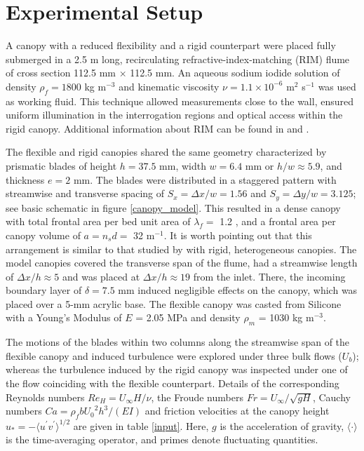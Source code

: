 \documentclass[lineno,authoryear]{FLO_v1}%
\theoremstyle{definition}
\begin{document}
\section{Experimental Setup}\label{sec:rules_submission}

A canopy with a reduced flexibility and a rigid counterpart were placed fully submerged in a 2.5 m long,  recirculating refractive-index-matching (RIM) flume of cross section 112.5 mm $\times$ 112.5 mm.  An aqueous sodium iodide solution of density $\rho_f = 1800$ kg m$^{-3}$ and kinematic viscosity $\nu = 1.1 \times 10^{-6}$ m$^2$ s$^{-1}$ was used as working fluid. This technique allowed measurements close to the wall, ensured uniform illumination in the interrogation regions and optical access within the rigid canopy. Additional  information about RIM can be found in \citet{blois2012versatile,bai2014refractive} and \citet{hamed2017impact}.


The flexible and rigid canopies shared the same geometry characterized by prismatic blades of height  $h=37.5$ mm, width $w=6.4$ mm or $h/w\approx 5.9$, and thickness $e=2$ mm. The blades were distributed in a staggered pattern with streamwise and transverse spacing of $S_x=\Delta x/w=1.56$ and $S_y= \Delta y/w=3.125$; see basic schematic in figure \ref{canopy_model}. This resulted in a dense canopy with total frontal area per bed unit area of $\lambda_f = $ 1.2 \citep{finnigan2000turbulence}, and a frontal area per canopy volume of $a = n_sd =$ 32 m$^{-1}$. It is worth pointing out that this arrangement is similar to that studied by \citet{hamed2017impact} with rigid, heterogeneous canopies. The model canopies covered the transverse span of the flume, had a streamwise length of $\Delta x/h\approx 5$ and was placed at $\Delta x/h\approx 19$ from the inlet. There, the incoming boundary layer of $\delta=7.5$ mm induced  negligible effects on the canopy, which was placed over a 5-mm acrylic base. The flexible canopy was casted from Silicone with a Young's Modulus of $E$ = 2.05 MPa and density $\rho_m$ = 1030 kg m$^{-3}$.

The motions of the blades within two columns along the streamwise span of the flexible canopy and induced turbulence were explored under three bulk flows ($U_b$); whereas the turbulence induced by the rigid canopy was inspected under one of the flow coinciding with the flexible counterpart. Details of the corresponding Reynolds numbers $Re_H = U_{\infty}H/\nu$, the Froude numbers $Fr = U_{\infty}/\sqrt{gH}$, Cauchy numbers $Ca = \rho_f b {U_0}^2 h^3/(EI)$ \citep{luhar2016wave} and friction velocities at the canopy height $u_* = -\langle u^\prime v^\prime\rangle ^{1/2}$ \citep{poggi2004effect, nezu2008turburence, chen2013flow} are given in table \ref{input}. Here, $g$ is the acceleration of gravity, $\langle \cdot \rangle$ is the time-averaging operator, and primes denote fluctuating quantities.
\end{document}
